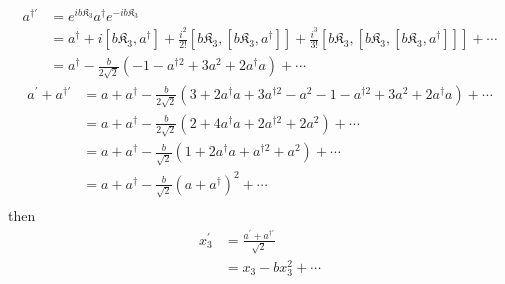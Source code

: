 \documentclass[]{article}
\numberwithin{equation}{section}
\begin{document}
{{\begin{align}
    a^{\dagger\prime}&=e^{ib  \mathfrak{K}_{3}}a^{\dagger}e^{-ib  \mathfrak{K}_{3}}\\
    &=a^{\dagger} + i\left[b  \mathfrak{K}_{3}, a^{\dagger} \right] + \frac{i^2}{2!}\left[b  \mathfrak{K}_{3}, \left[b  \mathfrak{K}_{3}, a^{\dagger} \right]\right] + \frac{i^3}{3!}\left[b  \mathfrak{K}_{3},\left[b  \mathfrak{K}_{3}, \left[b  \mathfrak{K}_{3}, a^{\dagger} \right]\right]\right] + \cdots\\
    &=a^{\dagger}-\frac{b}{2\sqrt{2}}\left(-1-a^{\dagger 2}+3a^2+2a^{\dagger} a\right) + \cdots
\end{align}
\begin{align}
    a^{\prime}+a^{\dagger\prime}&=a+a^{\dagger}-\frac{b}{2\sqrt{2}}\left(3+2a^\dagger a+3a^{\dagger 2}-a^2-1-a^{\dagger 2}+3a^2+2a^{\dagger} a\right)+ \cdots\\
    &=a+a^{\dagger}-\frac{b}{2\sqrt{2}}\left(2+4a^\dagger a+2a^{\dagger 2}+2a^2\right)+ \cdots\\
    &=a+a^{\dagger}-\frac{b}{\sqrt{2}}\left(1+2a^\dagger a+a^{\dagger 2}+a^2\right)+ \cdots\\
    &=a+a^{\dagger}-\frac{b}{\sqrt{2}}\left(a+a^{\dagger }\right)^2+ \cdots\\
\end{align}
then
\begin{align}
    x_{3}^{\prime}&= \frac{a^{\prime}+a^{\dagger\prime}}{\sqrt{2}}\\
    &=x_{3}-bx^{2}_{3}+ \cdots
\end{align}

}}
\end{document}
